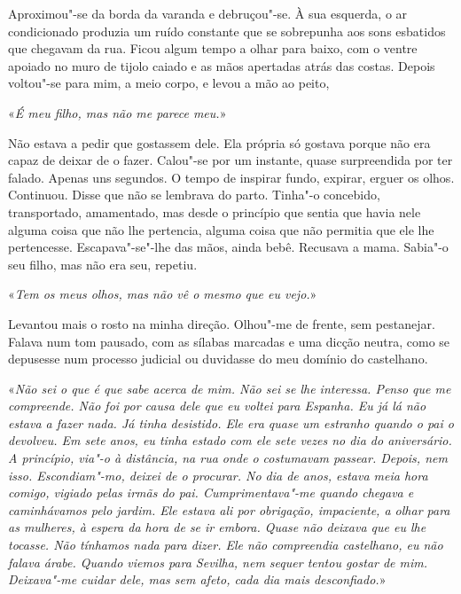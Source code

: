Aproximou"-se da borda da varanda e debruçou"-se. À sua esquerda, o ar
condicionado produzia um ruído constante que se sobrepunha aos sons
esbatidos que chegavam da rua. Ficou algum tempo a olhar para baixo, com
o ventre apoiado no muro de tijolo caiado e as mãos apertadas atrás das
costas. Depois voltou"-se para mim, a meio corpo, e levou a mão ao
peito,

«\emph{É meu filho, mas não me parece meu.}»

Não estava a pedir que gostassem dele. Ela própria só gostava porque não
era capaz de deixar de o fazer. Calou"-se por um instante, quase
surpreendida por ter falado. Apenas uns segundos. O tempo de inspirar
fundo, expirar, erguer os olhos. Continuou. Disse que não se lembrava do
parto. Tinha"-o concebido, transportado, amamentado, mas desde o
princípio que sentia que havia nele alguma coisa que não lhe pertencia,
alguma coisa que não permitia que ele lhe pertencesse. Escapava"-se"-lhe
das mãos, ainda bebê. Recusava a mama. Sabia"-o seu filho, mas não era
seu, repetiu.

«\emph{Tem os meus olhos, mas não vê o mesmo que eu vejo.}»

Levantou mais o rosto na minha direção. Olhou"-me de frente, sem
pestanejar. Falava num tom pausado, com as sílabas marcadas e uma dicção
neutra, como se depusesse num processo judicial ou duvidasse do meu
domínio do castelhano.

«\emph{Não sei o que é que sabe acerca de mim. Não sei se lhe interessa.
Penso que me compreende. Não foi por causa dele que eu voltei para
Espanha. Eu já lá não estava a fazer nada. Já tinha desistido. Ele era
quase um estranho quando o pai o devolveu. Em sete anos, eu tinha
estado com ele sete vezes no dia do aniversário. A princípio, via"-o à
distância, na rua onde o costumavam passear. Depois, nem isso.
Escondiam"-mo, deixei de o procurar. No dia de anos, estava meia hora
comigo, vigiado pelas irmãs do pai. Cumprimentava"-me quando chegava e
caminhávamos pelo jardim. Ele estava ali por obrigação, impaciente, a
olhar para as mulheres, à espera da hora de se ir embora. Quase não
deixava que eu lhe tocasse. Não tínhamos nada para dizer. Ele não
compreendia castelhano, eu não falava árabe. Quando viemos para Sevilha,
nem sequer tentou gostar de mim. Deixava"-me cuidar dele, mas sem
afeto, cada dia mais desconfiado.}»

